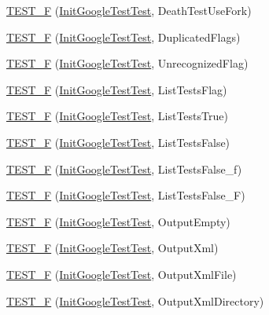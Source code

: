 \begin{DoxyCompactItemize}
\hyperlink{namespacetesting_aa5259681257cd3654f34dc81212c82bc}{T\+E\+S\+T\+\_\+\+F} (\hyperlink{classtesting_1_1_init_google_test_test}{Init\+Google\+Test\+Test}, Death\+Test\+Use\+Fork)
\item 
\hyperlink{namespacetesting_a34b640eb46cf4189bed01f18d42d3277}{T\+E\+S\+T\+\_\+\+F} (\hyperlink{classtesting_1_1_init_google_test_test}{Init\+Google\+Test\+Test}, Duplicated\+Flags)
\item 
\hyperlink{namespacetesting_a1572c861f65ca8d5dfb61246a32a2799}{T\+E\+S\+T\+\_\+\+F} (\hyperlink{classtesting_1_1_init_google_test_test}{Init\+Google\+Test\+Test}, Unrecognized\+Flag)
\item 
\hyperlink{namespacetesting_a1d111e67e0c6411085ff6d0911f50d18}{T\+E\+S\+T\+\_\+\+F} (\hyperlink{classtesting_1_1_init_google_test_test}{Init\+Google\+Test\+Test}, List\+Tests\+Flag)
\item 
\hyperlink{namespacetesting_a000181c6b1ac347a3d7797324808ea8d}{T\+E\+S\+T\+\_\+\+F} (\hyperlink{classtesting_1_1_init_google_test_test}{Init\+Google\+Test\+Test}, List\+Tests\+True)
\item 
\hyperlink{namespacetesting_acc2334b947370b550b7d6241e0d34124}{T\+E\+S\+T\+\_\+\+F} (\hyperlink{classtesting_1_1_init_google_test_test}{Init\+Google\+Test\+Test}, List\+Tests\+False)
\item 
\hyperlink{namespacetesting_a60e2b7e1cf88c2af6e04055b3afe7cbe}{T\+E\+S\+T\+\_\+\+F} (\hyperlink{classtesting_1_1_init_google_test_test}{Init\+Google\+Test\+Test}, List\+Tests\+False\+\_\+f)
\item 
\hyperlink{namespacetesting_a4933b012108ecb88243c2dbc13d7665b}{T\+E\+S\+T\+\_\+\+F} (\hyperlink{classtesting_1_1_init_google_test_test}{Init\+Google\+Test\+Test}, List\+Tests\+False\+\_\+\+F)
\item 
\hyperlink{namespacetesting_a121894d4edf72b1dbabdcde2bebd745d}{T\+E\+S\+T\+\_\+\+F} (\hyperlink{classtesting_1_1_init_google_test_test}{Init\+Google\+Test\+Test}, Output\+Empty)
\item 
\hyperlink{namespacetesting_a90df70c45f67d4c0dbc5bd29f7be3361}{T\+E\+S\+T\+\_\+\+F} (\hyperlink{classtesting_1_1_init_google_test_test}{Init\+Google\+Test\+Test}, Output\+Xml)
\item 
\hyperlink{namespacetesting_a810f99da1185404f8a899c919ee6433e}{T\+E\+S\+T\+\_\+\+F} (\hyperlink{classtesting_1_1_init_google_test_test}{Init\+Google\+Test\+Test}, Output\+Xml\+File)
\item 
\hyperlink{namespacetesting_ac351c3065ee89f7eb2fbba809db5c61d}{T\+E\+S\+T\+\_\+\+F} (\hyperlink{classtesting_1_1_init_google_test_test}{Init\+Google\+Test\+Test}, Output\+Xml\+Directory)

\end{DoxyCompactItemize}
